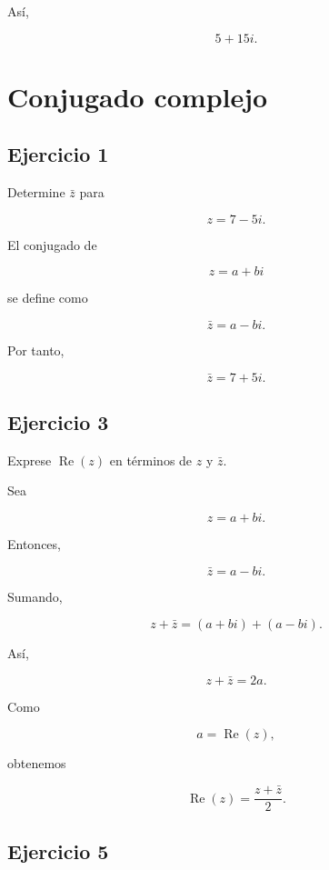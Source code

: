 \documentclass[12pt]{article}
\begin{document}
Así,

\[
\boxed{5+15i}.
\]

\section*{Conjugado complejo}

\subsection*{Ejercicio 1}

Determine \(\bar z\) para

\[
z=7-5i.
\]

El conjugado de

\[
z=a+bi
\]

se define como

\[
\bar z=a-bi.
\]

Por tanto,

\[
\boxed{\bar z=7+5i}.
\]


\subsection*{Ejercicio 3}

Exprese \(\operatorname{Re}(z)\) en términos de \(z\) y \(\bar z\).

Sea

\[
z=a+bi.
\]

Entonces,

\[
\bar z=a-bi.
\]

Sumando,

\[
z+\bar z
=
(a+bi)+(a-bi).
\]

Así,

\[
z+\bar z=2a.
\]

Como

\[
a=\operatorname{Re}(z),
\]

obtenemos

\[
\boxed{
\operatorname{Re}(z)=\frac{z+\bar z}{2}
}.
\]


\subsection*{Ejercicio 5}
\end{document}
